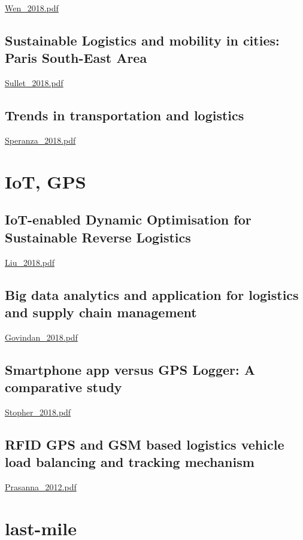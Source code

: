 \url{Wen_2018.pdf}\cite{Wen_2018}

\subsection{Sustainable Logistics and mobility in cities: Paris South-East Area}

\url{Sullet_2018.pdf}\cite{Sullet_2018}

\subsection{Trends in transportation and logistics}

\url{Speranza_2018.pdf}\cite{Speranza_2018}

\section{IoT, GPS}


\subsection{IoT-enabled Dynamic Optimisation for Sustainable Reverse Logistics}

\url{Liu_2018.pdf}\cite{Liu_2018}

\subsection{Big data analytics and application for logistics and supply chain management}

\url{Govindan_2018.pdf}\cite{Govindan_2018}

\subsection{Smartphone app versus GPS Logger: A comparative study}

\url{Stopher_2018.pdf}\cite{Stopher_2018}

\subsection{RFID GPS and GSM based logistics vehicle load balancing and tracking mechanism}

\url{Prasanna_2012.pdf}\cite{Prasanna_2012}

\section{last-mile}

